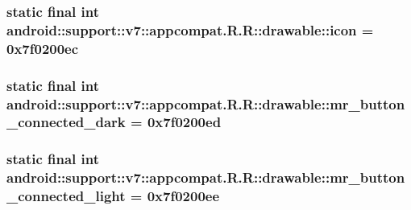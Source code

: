 \hypertarget{classandroid_1_1support_1_1v7_1_1appcompat_1_1_r_1_1drawable_c2c00d61bae5894037eb99163662e4a5}{
\subsubsection[{icon}]{\setlength{\rightskip}{0pt plus 5cm}static final int android::support::v7::appcompat.R.R::drawable::icon = 0x7f0200ec}}
\label{classandroid_1_1support_1_1v7_1_1appcompat_1_1_r_1_1drawable_c2c00d61bae5894037eb99163662e4a5}


\hypertarget{classandroid_1_1support_1_1v7_1_1appcompat_1_1_r_1_1drawable_bce611b6ad251bf820575bb9f9aca31b}{
\subsubsection[{mr\_\-button\_\-connected\_\-dark}]{\setlength{\rightskip}{0pt plus 5cm}static final int android::support::v7::appcompat.R.R::drawable::mr\_\-button\_\-connected\_\-dark = 0x7f0200ed}}
\label{classandroid_1_1support_1_1v7_1_1appcompat_1_1_r_1_1drawable_bce611b6ad251bf820575bb9f9aca31b}


\hypertarget{classandroid_1_1support_1_1v7_1_1appcompat_1_1_r_1_1drawable_69c10ae5a82f93e17e741830a8e8b8b8}{
\subsubsection[{mr\_\-button\_\-connected\_\-light}]{\setlength{\rightskip}{0pt plus 5cm}static final int android::support::v7::appcompat.R.R::drawable::mr\_\-button\_\-connected\_\-light = 0x7f0200ee}}
\label{classandroid_1_1support_1_1v7_1_1appcompat_1_1_r_1_1drawable_69c10ae5a82f93e17e741830a8e8b8b8}


